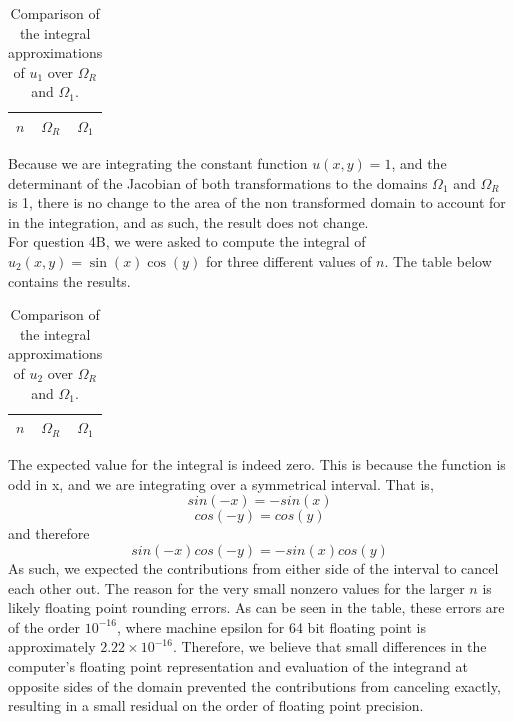 \documentclass[12pt]{article}
\begin{document}
\begin{table}[H]
    \centering
    \caption{Comparison of the integral approximations of $u_1$ over $\Omega_R$ and $\Omega_1$.}
    \label{tab:Question 4a}
    \begin{tabular}{c|cc}
        $n$ & $\Omega_R$ & $\Omega_1$ \\
        \hline
        
    \end{tabular}
\end{table}
Because we are integrating the constant function $u(x,y) = 1$, and the determinant of the Jacobian of both transformations to the domains $\Omega_1$ and $\Omega_R$ is 1, there is no change to the area of the non transformed domain to account for in the integration, and as such, the result does not change.
\\
For question 4B, we were asked to compute the integral of $u_2(x,y)=\sin(x)\cos(y)$ for three different values of $n$. The table below contains the results.
\begin{table}[H]
    \centering
    \caption{Comparison of the integral approximations of $u_2$ over $\Omega_R$ and $\Omega_1$.}
    \label{tab:Question 4b}
    \begin{tabular}{c|cc}
        $n$ & $\Omega_R$ & $\Omega_1$ \\
        \hline
        
    \end{tabular}
\end{table}
The expected value for the integral is indeed zero. This is because the function is odd in x, and we are integrating over a symmetrical interval. That is, 
\begin{equation}
    sin(-x) = -sin(x)
\end{equation}
\begin{equation} 
cos(-y) = cos(y) 
\end{equation}
and therefore
\begin{equation}
    sin(-x)cos(-y) = -sin(x)cos(y)
\end{equation}
As such, we expected the contributions from either side of the interval to cancel each other out. The reason for the very small nonzero values for the larger $n$ is likely floating point rounding errors. As can be seen in the table, these errors are of the order $10^{-16}$, where machine epsilon for 64 bit floating point is approximately $2.22 \times 10^{-16}$. Therefore, we believe that small differences in the computer's floating point representation and evaluation of the integrand at opposite sides of the domain prevented the contributions from canceling exactly, resulting in a small residual on the order of floating point precision.\\
\end{document}
